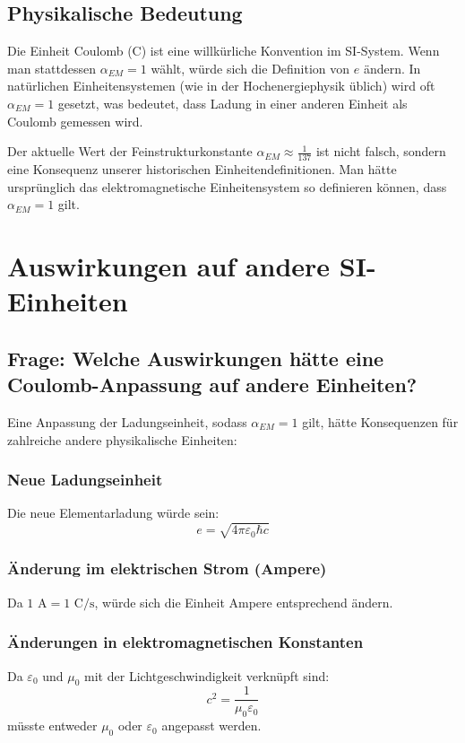 \documentclass[12pt,a4paper]{article}
\begin{document}
	\subsection{Physikalische Bedeutung}
	
	Die Einheit Coulomb (C) ist eine willkürliche Konvention im SI-System. Wenn man stattdessen $\alpha_{EM} = 1$ wählt, würde sich die Definition von $e$ ändern. In natürlichen Einheitensystemen (wie in der Hochenergiephysik üblich) wird oft $\alpha_{EM} = 1$ gesetzt, was bedeutet, dass Ladung in einer anderen Einheit als Coulomb gemessen wird.
	
	Der aktuelle Wert der Feinstrukturkonstante $\alpha_{EM} \approx \frac{1}{137}$ ist nicht falsch, sondern eine Konsequenz unserer historischen Einheitendefinitionen. Man hätte ursprünglich das elektromagnetische Einheitensystem so definieren können, dass $\alpha_{EM} = 1$ gilt.
	
	\section{Auswirkungen auf andere SI-Einheiten}
	
	\subsection{Frage: Welche Auswirkungen hätte eine Coulomb-Anpassung auf andere Einheiten?}
	
	Eine Anpassung der Ladungseinheit, sodass $\alpha_{EM} = 1$ gilt, hätte Konsequenzen für zahlreiche andere physikalische Einheiten:
	
	\subsubsection{Neue Ladungseinheit}
	Die neue Elementarladung würde sein:
	\begin{equation}
		e = \sqrt{4\pi\varepsilon_0\hbar c}
	\end{equation}
	
	\subsubsection{Änderung im elektrischen Strom (Ampere)}
	Da $1 \text{ A} = 1 \text{ C}/\text{s}$, würde sich die Einheit Ampere entsprechend ändern.
	
	\subsubsection{Änderungen in elektromagnetischen Konstanten}
	Da $\varepsilon_0$ und $\mu_0$ mit der Lichtgeschwindigkeit verknüpft sind:
	\begin{equation}
		c^2 = \frac{1}{\mu_0\varepsilon_0}
	\end{equation}
	müsste entweder $\mu_0$ oder $\varepsilon_0$ angepasst werden.
	
\end{document}
